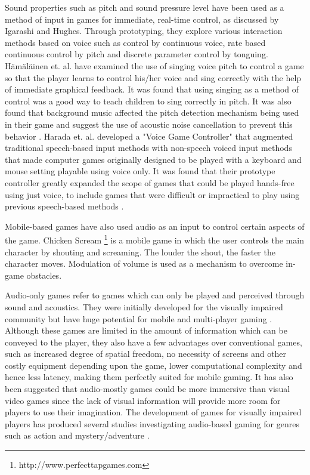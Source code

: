 \documentclass[convention]{aesconf}
\begin{document}
Sound properties such as pitch and sound pressure level have been used as a method of input in games for immediate, real-time control, as discussed by Igarashi and Hughes\cite{Igarashi:2001:VSU:502348.502372}. Through prototyping, they explore various interaction methods based on voice such as control by continuous voice, rate based continuous control by pitch and discrete parameter control by tonguing\cite{Igarashi:2001:VSU:502348.502372}. H{\"a}m{\"a}l{\"a}inen et. al. \cite{hamalainen2004musical} have examined the use of singing voice pitch to control a game so that the player learns to control his/her voice and sing correctly with the help of immediate graphical feedback. It was found that using singing as a method of control was a good way to teach children to sing correctly in pitch. It was also found that background music affected the pitch detection mechanism being used in their game and suggest the use of acoustic noise cancellation to prevent this behavior \cite{hamalainen2004musical}. Harada et. al. \cite{harada2011voice} developed a "Voice Game Controller" that augmented traditional speech-based input methods with non-speech voiced input methods that made computer games originally designed to be played with a keyboard and mouse setting playable using voice only. It was found that their prototype controller greatly expanded the scope of games that could be played hands-free using just voice, to include games that were difficult or impractical to play using previous speech-based methods \cite{harada2011voice}.

Mobile-based games have also used audio as an input to control certain aspects of the game. Chicken Scream \footnote{http://www.perfecttapgames.com} is a mobile game in which the user controls the main character by shouting and screaming. The louder the shout, the faster the character moves. Modulation of volume is used as a mechanism to overcome in-game obstacles.

Audio-only games refer to games which can only be played and perceived through sound and acoustics. They were initially developed for the visually impaired community but have huge potential for mobile and multi-player gaming \cite{rober2005playing}. Although these games are limited in the amount of information which can be conveyed to the player, they also have a few advantages over conventional games, such as increased degree of spatial freedom, no necessity of screens and other costly equipment depending upon the game, lower computational complexity and hence less latency, making them perfectly suited for mobile gaming. It has also been suggested that audio-mostly games could be more immersive than visual video games since the lack of visual information will provide more room for players to use their imagination\cite{liljedahl2007beowulf}. The development of games for visually impaired players has produced several studies investigating audio-based gaming for genres such as action\cite{Atkinson:2006:MMA:1183316.1183321} and mystery/adventure \cite{drewes2000sleuth}.
\end{document}

